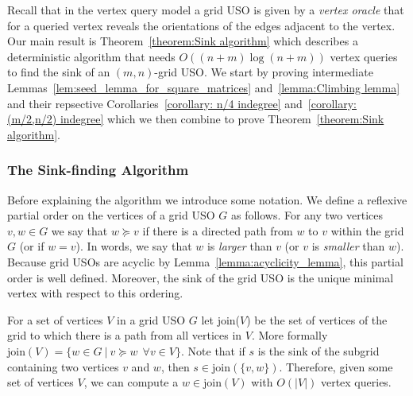 \documentclass[runningheads,a4paper]{llncs}
\newcommand{\JN}[1]{\marginpar{\parbox{3.6cm}{{\small {\bf JN:} #1}}}} %
\newcommand{\join}{\mbox{join}\xspace}
\begin{document}
Recall that in the vertex query model a grid USO is given by a \emph{vertex oracle} that for a queried vertex reveals the orientations of the edges adjacent to the vertex. Our main result is Theorem~\ref{theorem:Sink algorithm} which describes a deterministic algorithm that needs $O((n + m) \log (n + m))$ vertex queries to find the sink of an $(m, n)$-grid USO. We start by proving intermediate Lemmas~\ref{lem:seed_lemma_for_square_matrices} and~\ref{lemma:Climbing lemma} and their repsective Corollaries~\ref{corollary: n/4 indegree} and~\ref{corollary: (m/2,n/2) indegree} which we then combine to prove Theorem~\ref{theorem:Sink algorithm}. 

\subsubsection{The Sink-finding Algorithm}
\label{section:the_sink_finding_algorithm}

Before explaining the algorithm we introduce some notation. We define a reflexive partial order on the vertices of a grid USO $G$ as follows. 
For any two vertices $v,w \in G$ we say that $w \succeq v$ if there is a directed path from $w$ to $v$ within the grid $G$ (or if $w = v$). 
In words, we say that $w$ is \emph{larger} than $v$ (or $v$ is \emph{smaller} than $w$).
Because grid USOs are acyclic by Lemma~\ref{lemma:acyclicity_lemma}, this partial order is well defined.
Moreover, the sink of the grid USO is the unique minimal vertex with respect to this ordering. 

For a set of vertices $V$ in a grid USO $G$ let \join($V$) be the set of vertices of the grid to which there is a path from all vertices in $V$.  More formally $\join(V) = \{w \in G \: | \: v \succeq w \:\: \forall v \in V \}$. Note that if $s$ is the sink of the subgrid containing two vertices $v$ and $w$, then $s \in \join(\{v,w\})$. Therefore, given some set of vertices $V$, we can compute a $w \in \join(V)$ with $O(|V|)$ vertex queries.

\end{document}
